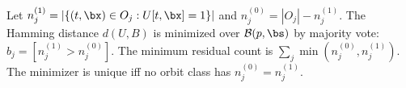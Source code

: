 \begin{theorem}\label{thm:projection}
Let $n_j^{(1)} = |\{(t,\bx) \in O_j : U[t,\bx] = 1\}|$ and $n_j^{(0)} = |O_j| - n_j^{(1)}$.
The Hamming distance $d(U, B)$ is minimized over $\mathcal{B}(p, \bs)$ by majority vote: $b_j = [n_j^{(1)} > n_j^{(0)}]$.
The minimum residual count is $\sum_j \min(n_j^{(0)}, n_j^{(1)})$.
The minimizer is unique iff no orbit class has $n_j^{(0)} = n_j^{(1)}$.
\end{theorem}
